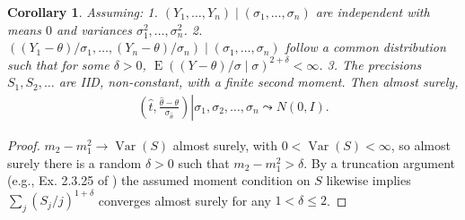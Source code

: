 \documentclass[12pt]{article}
\newtheorem{theorem}{Theorem}
\newtheorem{corollary}[theorem]{Corollary}
\newcommand{\m}{m}
\newcommand{\s}{S}
\newcommand{\y}{Y}
\renewcommand{\t}{t}
\newcommand{\thetahat}{\hat{\theta}}
\DeclareMathOperator{\E}{E}
\DeclareMathOperator{\var}{Var}
\begin{document}
\begin{corollary}
  Assuming: 1. $(\y_1,\ldots,\y_n) \mid (\sigma_1,\ldots,\sigma_n)$ are
  independent with means $0$ and variances
  $\sigma_1^2,\ldots,\sigma_n^2$.
  2. $((\y_1-\theta)/\sigma_1,\ldots,(\y_n-\theta)/\sigma_n) \mid
  (\sigma_1,\ldots,\sigma_n)$ follow a common distribution such that
  for some $\delta>0$,
  $\E((\y-\theta)/\sigma\mid\sigma)^{2+\delta}<\infty$. 3. The precisions
  $\s_1,\s_2,\ldots$ are IID, non-constant, with a finite second
  moment. %
  Then almost surely,
  \begin{align}
    \left.\left(\hat\t,\frac{\hat\theta-\theta}{\sigma_{\hat\theta}}\right)\right| \sigma_1,\sigma_2,\ldots,\sigma_n \leadsto N(0,I).
  \end{align}
\end{corollary}

\begin{proof}
  $\m_2-\m_1^2\to \var(\s)$ almost surely, with $0<\var(\s)<\infty$, so almost surely there is a random $\delta>0$ such that $\m_2-\m_1^2>\delta$. By a truncation argument (e.g., Ex. 2.3.25 of \citet{dembo:16}) the assumed moment condition on $\s$ likewise implies $\sum_j (\s_j/j)^{1+\delta}$ converges almost surely for any $1<\delta\le 2$.
\end{proof}

\end{document}
